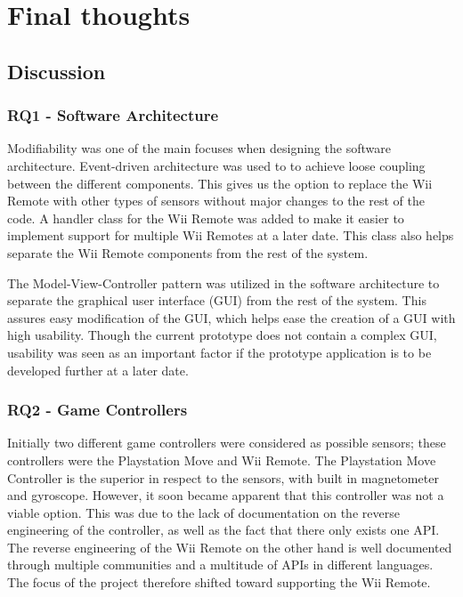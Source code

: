 \chapter{Final thoughts}


\section{Discussion}
\subsection{RQ1 - Software Architecture}
Modifiability was one of the main focuses when designing the software architecture. Event-driven architecture was used to to achieve loose coupling between the different components. This gives us the option to replace the Wii Remote with other types of sensors without major changes to the rest of the code. A handler class for the Wii Remote was added to make it easier to implement support for multiple Wii Remotes at a later date. This class also helps separate the Wii Remote components from the rest of the system. 

The Model-View-Controller pattern was utilized in the software architecture to separate the graphical user interface (GUI) from the rest of the system. This assures easy modification of the GUI, which helps ease the creation of a GUI with high usability. Though the current prototype does not contain a complex GUI, usability was seen as an important factor if the prototype application is to be developed further at a later date.

\subsection{RQ2 - Game Controllers}
Initially two different game controllers were considered as possible sensors; these controllers were the Playstation Move and Wii Remote. The Playstation Move Controller is the superior in respect to the sensors, with built in magnetometer and gyroscope. However, it soon became apparent that this controller was not a viable option. This was due to the lack of documentation on the reverse engineering of the controller, as well as the fact that there only exists one API. The reverse engineering of the Wii Remote on the other hand is well documented through multiple communities and a multitude of APIs in different languages. The focus of the project therefore shifted toward supporting the Wii Remote.

